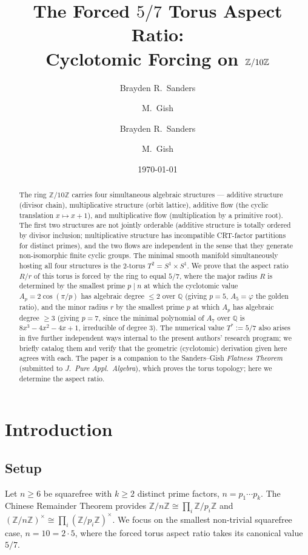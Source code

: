 \documentclass[11pt,reqno]{amsart}
\title[The forced $5/7$ torus]{The Forced $5/7$ Torus Aspect Ratio:\\
Cyclotomic Forcing on $\Z/10\Z$}
\author{Brayden R.\ Sanders \and M.\ Gish}
\author{Brayden R.\ Sanders \and M.\ Gish}
\date{\today}
\theoremstyle{plain}
\theoremstyle{definition}
\newcommand{\Z}{\mathbb{Z}}
\newcommand{\Q}{\mathbb{Q}}
\newcommand{\Zn}{\Z/n\Z}
\newcommand{\Zns}{(\Z/n\Z)^{\times}}
\newcommand{\Zts}{\Z/10\Z}
\newcommand{\Tstar}{T^{*}}
\begin{document}
\begin{abstract}
The ring $\Zts$ carries four simultaneous algebraic structures --- additive structure (divisor chain), multiplicative structure (orbit lattice), additive flow (the cyclic translation $x \mapsto x+1$), and multiplicative flow (multiplication by a primitive root). The first two structures are not jointly orderable (additive structure is totally ordered by divisor inclusion; multiplicative structure has incompatible CRT-factor partitions for distinct primes), and the two flows are independent in the sense that they generate non-isomorphic finite cyclic groups. The minimal smooth manifold simultaneously hosting all four structures is the $2$-torus $T^2 = S^1 \times S^1$. We prove that the aspect ratio $R/r$ of this torus is forced by the ring to equal $5/7$, where the major radius $R$ is determined by the smallest prime $p \mid n$ at which the cyclotomic value $A_p = 2 \cos(\pi/p)$ has algebraic degree $\leq 2$ over $\Q$ (giving $p = 5$, $A_5 = \varphi$ the golden ratio), and the minor radius $r$ by the smallest prime $p$ at which $A_p$ has algebraic degree $\geq 3$ (giving $p = 7$, since the minimal polynomial of $A_7$ over $\Q$ is $8 x^3 - 4 x^2 - 4 x + 1$, irreducible of degree $3$). The numerical value $\Tstar := 5/7$ also arises in five further independent ways internal to the present authors' research program; we briefly catalog them and verify that the geometric (cyclotomic) derivation given here agrees with each. The paper is a companion to the Sanders--Gish \emph{Flatness Theorem} (submitted to \emph{J.\ Pure Appl.\ Algebra}), which proves the torus topology; here we determine the aspect ratio.
\end{abstract}

\maketitle

\section{Introduction}

\subsection{Setup}

Let $n \geq 6$ be squarefree with $k \geq 2$ distinct prime factors, $n = p_1 \cdots p_k$. The Chinese Remainder Theorem provides $\Zn \cong \prod_i \Z/p_i\Z$ and $\Zns \cong \prod_i (\Z/p_i\Z)^{\times}$. We focus on the smallest non-trivial squarefree case, $n = 10 = 2 \cdot 5$, where the forced torus aspect ratio takes its canonical value $5/7$.
\end{document}
